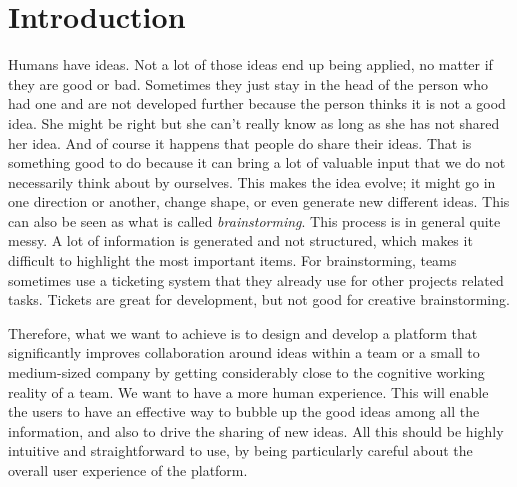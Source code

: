 \documentclass[a4paper,12pt, oneside]{article}
\newenvironment{acknowledgments}
  {\renewcommand{\abstractname}{Acknowledgments}
   \begin{abstract}}
  {\end{abstract}}
\begin{document}



\vspace*{5cm}
\begin{acknowledgments}
    \lipsum[1] %
\end{acknowledgments}
\newpage

\vspace*{5cm}
\begin{abstract}
    \lipsum[1] %
\end{abstract}
\newpage

\tableofcontents
\newpage

\setcounter{page}{1}


\section{Introduction}
Humans have ideas. Not a lot of those ideas end up being applied, no matter if they are good or bad.
Sometimes they just stay in the head of the person who had one and are not developed further because the person thinks it is not a good idea.
She might be right but she can't really know as long as she has not shared her idea.
And of course it happens that people do share their ideas.
That is something good to do because it can bring a lot of valuable input that we do not necessarily think about by ourselves.
This makes the idea evolve; it might go in one direction or another, change shape, or even generate new different ideas.
This can also be seen as what is called \emph{brainstorming}. This process is in general quite messy.
A lot of information is generated and not structured, which makes it difficult to highlight the most important items.
For brainstorming, teams sometimes use a ticketing system that they already use for other projects related tasks.
Tickets are great for development, but not good for creative brainstorming.

Therefore, what we want to achieve is to design and develop a platform that significantly improves collaboration around ideas within a team or a small to medium-sized company by getting considerably close to the cognitive working reality of a team.
We want to have a more human experience.
This will enable the users to have an effective way to bubble up the good ideas among all the information, and also to drive the sharing of new ideas.
All this should be highly intuitive and straightforward to use, by being particularly careful about the overall user experience of the platform.
\end{document}
